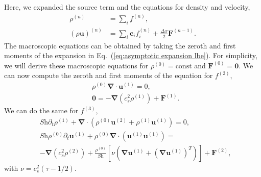 \documentclass[fleqn,a4paper]{article} %
\numberwithin{equation}{section} %
\numberwithin{figure}{section} %
\numberwithin{table}{section} %
\numberwithin{algorithm}{section} %
\begin{document}
Here, we expanded the source term and the equations for density and velocity,
\begin{equation}
\begin{split}
    \rho^{(n)} &= \sum_i f^{(n)},\\
    \left(\rho \bm{u}\right)^{(n)} &= \sum_i \bm{c}_i f_i^{(n)} +  \frac{\Delta x}{2}\bm{F}^{(n-1)}.
\end{split}
\end{equation}
The macroscopic equations can be obtained by taking the zeroth and first moments of the expansion in Eq.~(\ref{eq:asymptotic expansion lbe}). For simplicity, we will derive these macroscopic equations for $\rho^{(0)} = \text{const}$ and $\bm{F}^{(0)} = \bm{0}$. We can now compute the zeroth and first moments of the equation for $f^{(2)}$, 
\begin{equation}
\begin{split}
    & \rho^{(0)}\bm{\nabla}\cdot \bm{u}^{(1)} = 0,\\
    & \bm{0} =-\bm{\nabla} \left(c_s^2 \rho^{(1)}\right)+ \bm{F}^{(1)}.
\end{split}
\end{equation}
We can do the same for $f^{(3)}$,
\begin{equation}
\begin{split}
    &\textit{Sh}\partial_t \rho^{(1)} + \bm{\nabla} \cdot \left(\rho^{(0)} \bm{u}^{(2)} + \rho^{(1)} \bm{u}^{(1)}\right) = 0,\\
    &\textit{Sh}\rho^{(0)}\partial_t \bm{u}^{(1)} + \rho^{(0)}\bm{\nabla}\cdot\left(\bm{u}^{(1)}\bm{u}^{(1)}\right) =\\
    &-\bm{\nabla} \left(c_s^2 \rho^{(2)}\right)  + \frac{\rho^{(0)}}{\textit{Sh}}\left[\nu \left(\bm{\nabla} \bm{u}^{(1)} + \left(\bm{\nabla} \bm{u}^{(1)}\right)^T\right)\right]+ \bm{F}^{(2)},
\end{split}
\end{equation}
with $\nu = c_s^2 (\tau - 1/2)$. 
\end{document}
